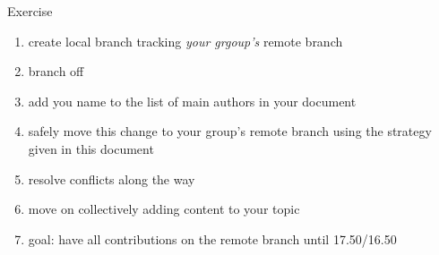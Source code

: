 \begin{frame}{Exercise}

\begin{enumerate}
 \item create local branch tracking \emph{your grgoup's} remote branch
 \item branch off
 \item add you name to the list of main authors in your document
 \item safely move this change to your group's remote branch using the
       strategy given in this document
 \item resolve conflicts along the way
 \vfill
 \item move on collectively adding content to your topic
 \item goal: have all contributions on the remote branch until 17.50/16.50
\end{enumerate}

\end{frame}

